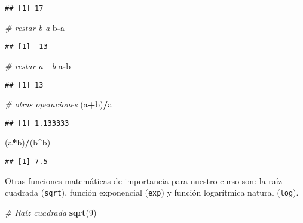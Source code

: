 \documentclass[]{book}
\newenvironment{Shaded}{\begin{snugshade}}{\end{snugshade}}
\newcommand{\CommentTok}[1]{\textcolor[rgb]{0.56,0.35,0.01}{\textit{#1}}}
\newcommand{\DecValTok}[1]{\textcolor[rgb]{0.00,0.00,0.81}{#1}}
\newcommand{\KeywordTok}[1]{\textcolor[rgb]{0.13,0.29,0.53}{\textbf{#1}}}
\newcommand{\NormalTok}[1]{#1}
\newcommand{\OperatorTok}[1]{\textcolor[rgb]{0.81,0.36,0.00}{\textbf{#1}}}
\begin{document}
\begin{verbatim}
## [1] 17
\end{verbatim}

\begin{Shaded}
\begin{Highlighting}[]
\CommentTok{# restar b-a}
\NormalTok{b}\OperatorTok{-}\NormalTok{a}
\end{Highlighting}
\end{Shaded}

\begin{verbatim}
## [1] -13
\end{verbatim}

\begin{Shaded}
\begin{Highlighting}[]
\CommentTok{# restar a - b}
\NormalTok{a}\OperatorTok{-}\NormalTok{b}
\end{Highlighting}
\end{Shaded}

\begin{verbatim}
## [1] 13
\end{verbatim}

\begin{Shaded}
\begin{Highlighting}[]
\CommentTok{# otras operaciones}
\NormalTok{(a}\OperatorTok{+}\NormalTok{b)}\OperatorTok{/}\NormalTok{a}
\end{Highlighting}
\end{Shaded}

\begin{verbatim}
## [1] 1.133333
\end{verbatim}

\begin{Shaded}
\begin{Highlighting}[]
\NormalTok{(a}\OperatorTok{*}\NormalTok{b)}\OperatorTok{/}\NormalTok{(b}\OperatorTok{^}\NormalTok{b)}
\end{Highlighting}
\end{Shaded}

\begin{verbatim}
## [1] 7.5
\end{verbatim}

Otras funciones matemáticas de importancia para nuestro curso son: la raíz cuadrada (\texttt{sqrt}), función
exponencial (\texttt{exp}) y función logarítmica natural (\texttt{log}).

\begin{Shaded}
\begin{Highlighting}[]
\CommentTok{# Raíz cuadrada}
\KeywordTok{sqrt}\NormalTok{(}\DecValTok{9}\NormalTok{)}
\end{Highlighting}
\end{Shaded}
\end{document}

